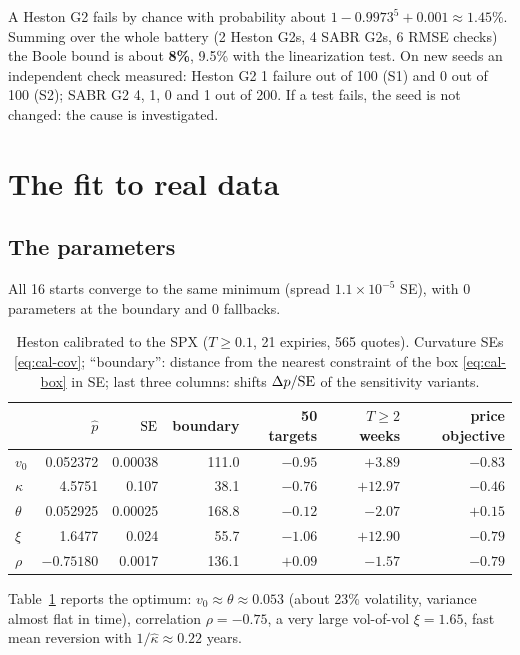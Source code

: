 \begin{attenzione}[title={How often does a correct test fail by chance?}]
A Heston G2 fails by chance with probability about $1-0.9973^5+0.001\approx1.45\%$. Summing over the whole battery
(2 Heston G2s, 4 SABR G2s, 6 RMSE checks) the Boole bound is about \textbf{8\%}, 9.5\% with the linearization test. On
new seeds an independent check measured: Heston G2 1 failure out of 100 (S1) and 0 out of 100 (S2); SABR G2 4, 1, 0
and 1 out of 200. If a test fails, the seed is not changed: the cause is investigated.
\end{attenzione}

\section{The fit to real data}
\subsection{The parameters}
All 16 starts converge to the same minimum (spread $1.1\times10^{-5}$ SE), with 0 parameters at the boundary and 0
fallbacks.

\begin{table}[htbp]
\centering
\small
\caption{Heston calibrated to the SPX ($T\ge0.1$, 21 expiries, 565 quotes). Curvature SEs \eqref{eq:cal-cov};
``boundary'': distance from the nearest constraint of the box \eqref{eq:cal-box} in SE; last three columns: shifts
$\Delta p/\mathrm{SE}$ of the sensitivity variants.}
\label{tab:cal-fit}
\begin{tabular*}{\textwidth}{@{\extracolsep{\fill}}lrrrrrr@{}}
\toprule
& $\hat p$ & $\mathrm{SE}$ & boundary & 50 targets & $T\ge2$ weeks & price objective\\
\midrule
$v_0$ & 0.052372 & 0.00038 & 111.0 & $-0.95$ & $+3.89$ & $-0.83$\\
$\kappa$ & 4.5751 & 0.107 & 38.1 & $-0.76$ & $+12.97$ & $-0.46$\\
$\theta$ & 0.052925 & 0.00025 & 168.8 & $-0.12$ & $-2.07$ & $+0.15$\\
$\xi$ & 1.6477 & 0.024 & 55.7 & $-1.06$ & $+12.90$ & $-0.79$\\
$\rho$ & $-0.75180$ & 0.0017 & 136.1 & $+0.09$ & $-1.57$ & $-0.79$\\
\bottomrule
\end{tabular*}
\end{table}

Table~\ref{tab:cal-fit} reports the optimum: $v_0\approx\theta\approx0.053$ (about 23\% volatility, variance almost
flat in time), correlation $\rho=-0.75$, a very large vol-of-vol $\xi=1.65$, fast mean reversion with
$1/\hat\kappa\approx0.22$ years.

